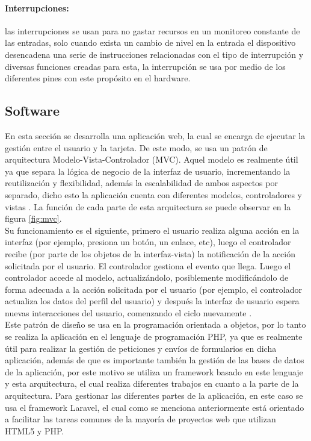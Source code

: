 \paragraph{Interrupciones:}

las interrupciones se usan para no gastar recursos en un monitoreo constante de las entradas, solo cuando exista un cambio de nivel en la entrada el dispositivo desencadena una serie de instrucciones relacionadas con el tipo de interrupción y diversas funciones creadas para esta, la interrupción se usa por medio de los diferentes pines con este propósito en el hardware.

\subsection{Software}

En esta sección se desarrolla una aplicación web, la cual se encarga de ejecutar la gestión entre el usuario y la tarjeta. De este modo, se usa un patrón de arquitectura Modelo-Vista-Controlador (MVC). Aquel modelo es realmente útil ya que separa la lógica de negocio de la interfaz de usuario, incrementando la reutilización y flexibilidad, además la escalabilidad de ambos aspectos por separado, dicho esto la aplicación cuenta con diferentes modelos, controladores y vistas \cite{MVC1}. La función de cada parte de esta arquitectura se puede observar en la figura \ref{fig:mvc}.\\



Su funcionamiento es el siguiente, primero el usuario realiza alguna acción en la interfaz (por ejemplo, presiona un botón, un enlace, etc), luego el controlador recibe (por parte de los objetos de la interfaz-vista) la notificación de la acción solicitada por el usuario. El controlador gestiona el evento que llega. Luego el controlador accede al modelo, actualizándolo, posiblemente modificándolo de forma adecuada a la acción solicitada por el usuario (por ejemplo, el controlador actualiza los datos del perfil del usuario) y después la interfaz de usuario espera nuevas interacciones del usuario, comenzando el ciclo nuevamente \cite{MVC2}.\\

Este patrón de diseño se usa en la programación orientada a objetos, por lo tanto se realiza la aplicación en el lenguaje de programación PHP, ya que es realmente útil para realizar la gestión de peticiones y envíos de formularios en dicha aplicación, además de que es importante también la gestión de las bases de datos de la aplicación, por este motivo se utiliza un framework basado en este lenguaje y esta arquitectura, el cual realiza diferentes trabajos en cuanto a la parte de la arquitectura. Para gestionar las diferentes partes de la aplicación, en este caso se usa el framework Laravel, el cual como se menciona anteriormente está orientado a facilitar las tareas comunes de la mayoría de proyectos web que utilizan HTML5 y PHP.\\

